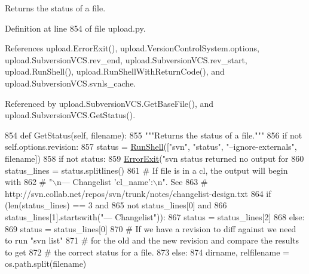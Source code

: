 \begin{DoxyVerb}Returns the status of a file.\end{DoxyVerb}
 

Definition at line 854 of file upload.\+py.



References upload.\+Error\+Exit(), upload.\+Version\+Control\+System.\+options, upload.\+Subversion\+V\+C\+S.\+rev\+\_\+end, upload.\+Subversion\+V\+C\+S.\+rev\+\_\+start, upload.\+Run\+Shell(), upload.\+Run\+Shell\+With\+Return\+Code(), and upload.\+Subversion\+V\+C\+S.\+svnls\+\_\+cache.



Referenced by upload.\+Subversion\+V\+C\+S.\+Get\+Base\+File(), and upload.\+Subversion\+V\+C\+S.\+Get\+Status().


\begin{DoxyCode}
854   \textcolor{keyword}{def }GetStatus(self, filename):
855     \textcolor{stringliteral}{"""Returns the status of a file."""}
856     \textcolor{keywordflow}{if} \textcolor{keywordflow}{not} self.options.revision:
857       status = \hyperlink{namespaceupload_adddc423c49132e8879cbb25d6be2cf11}{RunShell}([\textcolor{stringliteral}{"svn"}, \textcolor{stringliteral}{"status"}, \textcolor{stringliteral}{"--ignore-externals"}, filename])
858       \textcolor{keywordflow}{if} \textcolor{keywordflow}{not} status:
859         \hyperlink{namespaceupload_adea53186a1d73e92cc839b7c35c2c044}{ErrorExit}(\textcolor{stringliteral}{"svn status returned no output for %
860       status\_lines = status.splitlines()
861       \textcolor{comment}{# If file is in a cl, the output will begin with}
862       \textcolor{comment}{# "\(\backslash\)n--- Changelist 'cl\_name':\(\backslash\)n".  See}
863       \textcolor{comment}{# http://svn.collab.net/repos/svn/trunk/notes/changelist-design.txt}
864       \textcolor{keywordflow}{if} (len(status\_lines) == 3 \textcolor{keywordflow}{and}
865           \textcolor{keywordflow}{not} status\_lines[0] \textcolor{keywordflow}{and}
866           status\_lines[1].startswith(\textcolor{stringliteral}{"--- Changelist"})):
867         status = status\_lines[2]
868       \textcolor{keywordflow}{else}:
869         status = status\_lines[0]
870     \textcolor{comment}{# If we have a revision to diff against we need to run "svn list"}
871     \textcolor{comment}{# for the old and the new revision and compare the results to get}
872     \textcolor{comment}{# the correct status for a file.}
873     \textcolor{keywordflow}{else}:
874       dirname, relfilename = os.path.split(filename)
}
\end{DoxyCode}

